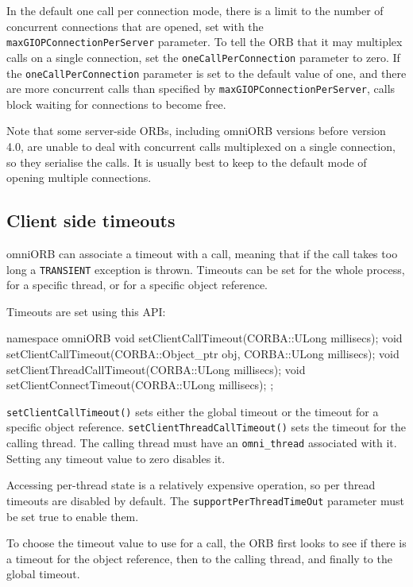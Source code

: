 \documentclass[11pt,twoside,a4paper]{book}
\newcommand{\code}[1]{\texttt{#1}}
\newcommand{\op}[1]{\texttt{#1()}}
\newcommand{\dsc}{\discretionary{}{}{}}
\begin{document}
In the default one call per connection mode, there is a limit to the
number of concurrent connections that are opened, set with the
\code{maxGIOPConnection\dsc{}PerServer} parameter. To tell the ORB
that it may multiplex calls on a single connection, set the
\code{oneCallPerConnection} parameter to zero. If the
\code{oneCallPer\dsc{}Connection} parameter is set to the default
value of one, and there are more concurrent calls than specified by
\code{maxGIOPConnectionPerServer}, calls block waiting for connections
to become free.

Note that some server-side ORBs, including omniORB versions before
version 4.0, are unable to deal with concurrent calls multiplexed on a
single connection, so they serialise the calls. It is usually best to
keep to the default mode of opening multiple connections.


\subsection{Client side timeouts}
\label{sec:timeoutAPI}

omniORB can associate a timeout with a call, meaning that if the call
takes too long a \code{TRANSIENT} exception is thrown. Timeouts can be
set for the whole process, for a specific thread, or for a specific
object reference.

Timeouts are set using this API:

\begin{cxxlisting}
namespace omniORB {
  void setClientCallTimeout(CORBA::ULong millisecs);
  void setClientCallTimeout(CORBA::Object_ptr obj, CORBA::ULong millisecs);
  void setClientThreadCallTimeout(CORBA::ULong millisecs);
  void setClientConnectTimeout(CORBA::ULong millisecs);
};
\end{cxxlisting}

\op{setClientCallTimeout} sets either the global timeout or the
timeout for a specific object reference.
\op{setClientThreadCallTimeout} sets the timeout for the calling
thread. The calling thread must have an \code{omni\_thread} associated
with it. Setting any timeout value to zero disables it.

Accessing per-thread state is a relatively expensive operation, so per
thread timeouts are disabled by default. The
\code{supportPerThreadTimeOut} parameter must be set true to enable
them.

To choose the timeout value to use for a call, the ORB first looks to
see if there is a timeout for the object reference, then to the
calling thread, and finally to the global timeout.
\end{document}
